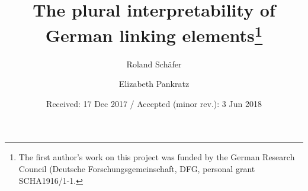 
\title{The plural interpretability of German linking elements\thanks{The first author's work on this project was funded by the German Research Council (Deutsche Forschungsgemeinschaft, DFG, personal grant SCHA1916/1-1.}}
\author{Roland Schäfer \and Elizabeth Pankratz}
\date{Received: 17 Dec 2017 / Accepted (minor rev.): 3 Jun 2018}
